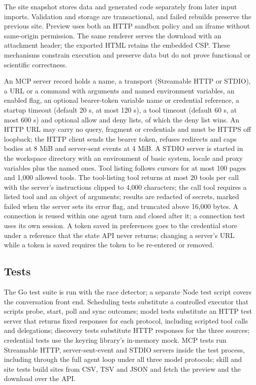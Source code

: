 \documentclass[11pt,a4paper]{article}
\begin{document}
The site snapshot stores data and generated code separately from later
input imports. Validation and storage are transactional, and failed
rebuilds preserve the previous site. Preview uses both an HTTP sandbox
policy and an iframe without same-origin permission. The same renderer
serves the download with an attachment header; the exported HTML retains
the embedded CSP. These mechanisms constrain execution and preserve data
but do not prove functional or scientific correctness.

An MCP server record holds a name, a transport (Streamable HTTP or
STDIO), a URL or a command with arguments and named environment
variables, an enabled flag, an optional bearer-token variable name or
credential reference, a startup timeout (default 20 s, at most 120 s), a
tool timeout (default 60 s, at most 600 s) and optional allow and deny
lists, of which the deny list wins. An HTTP URL may carry no query,
fragment or credentials and must be HTTPS off loopback; the HTTP client
sends the bearer token, refuses redirects and caps bodies at 8 MiB and
server-sent events at 4 MiB. A STDIO server is started in the workspace
directory with an environment of basic system, locale and proxy
variables plus the named ones. Tool listing follows cursors for at most
100 pages and 1,000 allowed tools. The tool-listing tool returns at
most 20 tools per call with the server's instructions clipped to 4,000
characters; the call tool requires a listed tool and an object of
arguments; results are redacted of secrets, marked failed when the
server sets its error flag, and truncated above 16,000 bytes. A
connection is reused within one agent turn and closed after it; a
connection test uses its own session. A token saved in preferences goes
to the credential store under a reference that the state API never
returns; changing a server's URL while a token is saved requires the
token to be re-entered or removed.

\subsection{Tests}\label{tests}

The Go test suite is run with the race detector; a separate Node test script covers the
conversation front end. Scheduling tests substitute a controlled
executor that scripts probe, start, poll and sync outcomes; model tests
substitute an HTTP test server that returns fixed responses for each
protocol, including scripted tool calls and delegations; discovery tests
substitute HTTP responses for the three sources; credential tests use
the keyring library's in-memory mock. MCP tests run Streamable HTTP,
server-sent-event and STDIO servers inside the test process, including
through the full agent loop under all three model protocols; skill and
site tests build sites from CSV, TSV and JSON and fetch the preview and
the download over the API.
\end{document}
